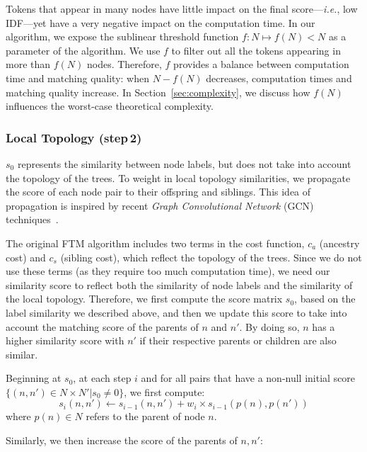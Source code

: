 Tokens that appear in many nodes have little impact on the final score---\emph{i.e.}, low IDF---yet have a very negative impact on the computation time.
In our algorithm, we expose the sublinear threshold function $f: N \mapsto f(N) < N$ as a parameter of the algorithm.
We use $f$ to filter out all the tokens appearing in more than $f(N)$ nodes.
Therefore, $f$ provides a balance between computation time and matching quality: when $N-f(N)$ decreases, computation times and matching quality increase.
In Section~\ref{sec:complexity}, we discuss how $f(N)$ influences the worst-case theoretical complexity.

\subsubsection{Local Topology (step\,2)}
$s_{0}$ represents the similarity between node labels, but does not take into account the topology of the trees.
To weight in local topology similarities, we propagate the score of each node pair to their offspring and siblings.
This idea of propagation is inspired by recent \emph{Graph Convolutional Network} (GCN) techniques~\cite{kipf2016semi}.

The original FTM algorithm includes two terms in the cost function, $c_a$ (ancestry cost) and $c_s$ (sibling cost), which reflect the topology of the trees.
Since we do not use these terms (as they require too much computation time), we need our similarity score to reflect both the similarity of node labels and the similarity of the local topology.
Therefore, we first compute the score matrix $s_0$, based on the label similarity we described above, and then we update this score to take into account the matching score of the parents of $n$ and $n'$.
By doing so, $n$ has a higher similarity score with $n'$ if their respective parents or children are also similar.

Beginning at $s_0$, at each step $i$ and for all pairs that have a non-null initial score  $\{(n, n')\in N \times N' | s_0 \neq 0\}$, we first compute:
\begin{equation}\label{eq:score}
	s_{i}(n, n') \gets s_{i-1}(n, n') +  w_i \times s_{i-1}(p(n), p(n'))
\end{equation}
where $p(n) \in N$ refers to the parent of node $n$.

Similarly, we then increase the score of the parents of $n, n'$:

